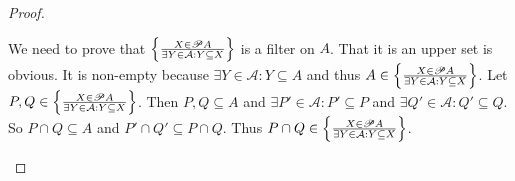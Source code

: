 \begin{proof}
\begin{grayed}
We need to prove that $\left\{ \frac{X\in\mathscr{P} A}{\exists Y\in\mathcal{A}:Y\subseteq X}\right\}$
is a filter on $A$. That it is an upper set is obvious. It is non-empty
because $\exists Y\in\mathcal{A}:Y\subseteq A$ and thus $A\in\left\{ \frac{X\in\mathscr{P} A}{\exists Y\in\mathcal{A}:Y\subseteq X}\right\}$.
Let $P,Q\in\left\{ \frac{X\in\mathscr{P} A}{\exists Y\in\mathcal{A}:Y\subseteq X}\right\}$.
Then $P,Q\subseteq A$ and $\exists P'\in\mathcal{A}:P'\subseteq P$
and $\exists Q'\in\mathcal{A}:Q'\subseteq Q$. So $P\cap Q\subseteq A$
and $P'\cap Q'\subseteq P\cap Q$. Thus $P\cap Q\in\left\{ \frac{X\in\mathscr{P} A}{\exists Y\in\mathcal{A}:Y\subseteq X}\right\}$.
\end{grayed}
\end{proof}

